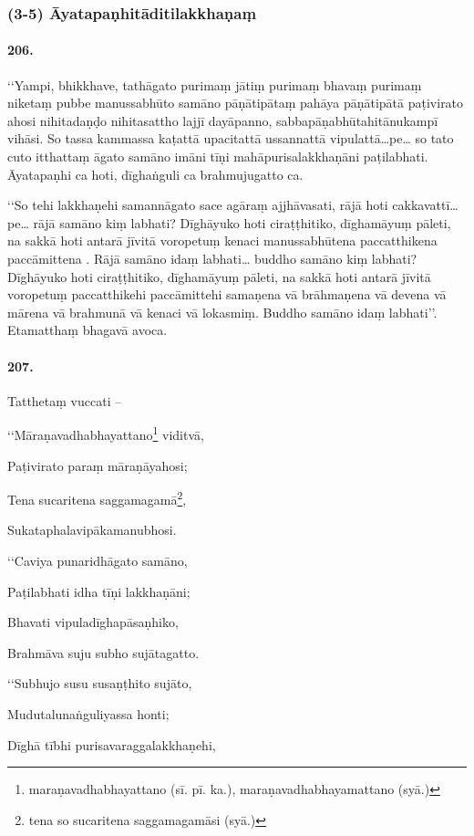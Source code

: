 \subsubsection{(3-5) Āyatapaṇhitāditilakkhaṇaṃ}

\paragraph{206.} ‘‘Yampi, bhikkhave, tathāgato purimaṃ jātiṃ purimaṃ bhavaṃ purimaṃ niketaṃ pubbe manussabhūto samāno pāṇātipātaṃ pahāya pāṇātipātā paṭivirato ahosi nihitadaṇḍo nihitasattho lajjī dayāpanno, sabbapāṇabhūtahitānukampī vihāsi. So tassa kammassa kaṭattā upacitattā ussannattā vipulattā…pe… so tato cuto itthattaṃ āgato samāno imāni tīṇi mahāpurisalakkhaṇāni paṭilabhati. Āyatapaṇhi ca hoti, dīghaṅguli ca brahmujugatto ca.

‘‘So tehi lakkhaṇehi samannāgato sace agāraṃ ajjhāvasati, rājā hoti cakkavattī…pe… rājā samāno kiṃ labhati? Dīghāyuko hoti ciraṭṭhitiko, dīghamāyuṃ pāleti, na sakkā hoti antarā jīvitā voropetuṃ kenaci manussabhūtena paccatthikena paccāmittena . Rājā samāno idaṃ labhati… buddho samāno kiṃ labhati? Dīghāyuko hoti ciraṭṭhitiko, dīghamāyuṃ pāleti, na sakkā hoti antarā jīvitā voropetuṃ paccatthikehi paccāmittehi samaṇena vā brāhmaṇena vā devena vā mārena vā brahmunā vā kenaci vā lokasmiṃ. Buddho samāno idaṃ labhati’’. Etamatthaṃ bhagavā avoca.

\paragraph{207.} Tatthetaṃ vuccati –

‘‘Māraṇavadhabhayattano\footnote{maraṇavadhabhayattano (sī. pī. ka.), maraṇavadhabhayamattano (syā.)} viditvā,

Paṭivirato paraṃ māraṇāyahosi;

Tena sucaritena saggamagamā\footnote{tena so sucaritena saggamagamāsi (syā.)},

Sukataphalavipākamanubhosi.

‘‘Caviya punaridhāgato samāno,

Paṭilabhati idha tīṇi lakkhaṇāni;

Bhavati vipuladīghapāsaṇhiko,

Brahmāva suju subho sujātagatto.

‘‘Subhujo susu susaṇṭhito sujāto,

Mudutalunaṅguliyassa honti;

Dīghā tībhi purisavaraggalakkhaṇehi,

